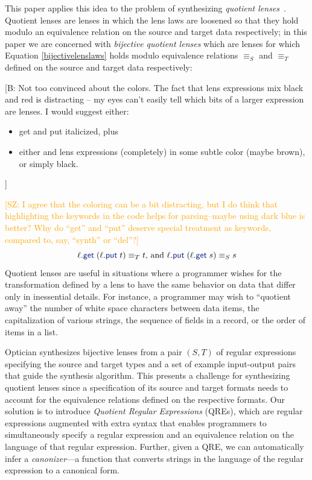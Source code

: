 \documentclass[acmsmall,review,anonymous]{acmart}
\newcommand{\FINISH}[3]{\ifdraft\textcolor{#1}{[#2: #3]}\fi}
\newcommand{\bcp}[1]{\FINISH{dkred}{B}{#1}}
\newcommand{\saz}[1]{\FINISH{orange}{SZ}{#1}}
\newcommand{\kw}[1]{\textcolor{dkblue}{\ensuremath{\mathsf{#1}}}}
\newcommand{\get}{\ensuremath{\kw{get}}}
\newcommand{\lput}{\ensuremath{\kw{put}}}
\begin{document}
This paper applies this idea to the problem of
synthesizing {\em quotient lenses}~\cite{quotientlenses}.
Quotient lenses are lenses in which the lens laws are
loosened so that they hold modulo an equivalence relation on the source and
target data respectively; in this paper we are concerned with {\em bijective
quotient lenses} which are lenses for which Equation \ref{bijectivelenslaws}
holds modulo equivalence relations $\equiv_S$ and $\equiv_T$ defined on the source
and target data respectively:\bcp{Not too convinced about the colors.  The
  fact that lens expressions mix black and red is distracting -- my eyes
  can't easily tell which bits of a larger expression are lenses.  I would
  suggest either:
  \begin{itemize}
  \item get and put italicized, plus
  \item either and lens expressions (completely) in some subtle color (maybe
  brown), or simply black.
  \end{itemize}
}\saz{I agree that the coloring can be a bit distracting, but I do think that
  highlighting the keywords in the code helps for parsing--maybe using dark blue
  is better? Why do ``get'' and ``put'' deserve special treatment as keywords,
  compared to, say, ``synth'' or ``del''?}
\begin{equation}\label{quotientlenslaws}
\ell.\get \; (\ell.\lput \; t) \equiv_T t \text{, and } \ell.\lput \; (\ell.\get
\; s) \equiv_S s
\end{equation}
Quotient lenses are useful in situations where a programmer wishes for the
transformation defined by a lens to have the same behavior on data that differ
only in inessential details. For instance, a programmer may wish to ``quotient
away'' the number of white space characters between data items, the
capitalization of various strings, the sequence of fields in a record, or the
order of items in a list.

Optician synthesizes bijective lenses from a pair $(S, T)$ of regular
expressions
specifying the source and target types and a set of example input-output pairs
that guide the synthesis algorithm. This presents a challenge for synthesizing
quotient lenses since a specification of its source and target formats
needs to account for the equivalence relations defined on the
respective formats. Our solution is to introduce {\em Quotient Regular
Expressions} (QREs), which are regular expressions augmented with extra
syntax that enables programmers to simultaneously specify a regular expression
and an equivalence relation on the language of that regular expression.
Further, given a QRE, we can automatically infer a \emph{canonizer}---a
function that converts strings in the language of the regular expression
to a canonical form.
\end{document}
